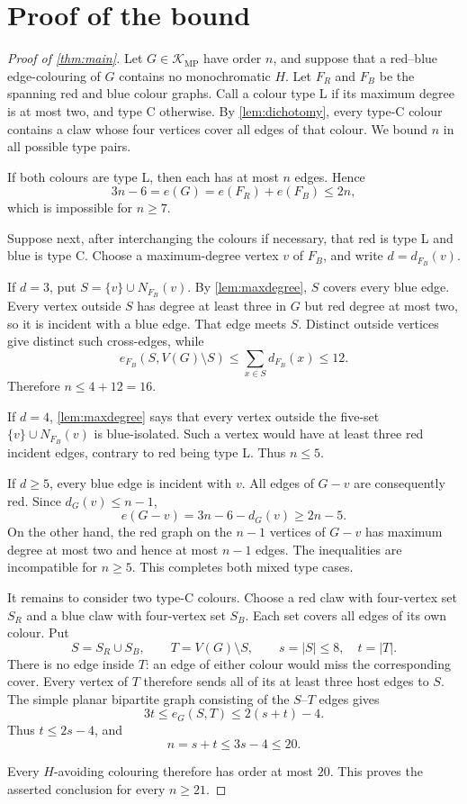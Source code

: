 \documentclass[11pt]{article}
\newcommand{\MP}{\mathrm{MP}}
\newcommand{\cK}{\mathcal{K}}
\begin{document}
\section{Proof of the bound}

\begin{proof}[Proof of \cref{thm:main}]
Let $G\in\cK_{\MP}$ have order $n$, and suppose that a red--blue
edge-colouring of $G$ contains no monochromatic $H$.  Let $F_R$ and $F_B$
be the spanning red and blue colour graphs.  Call a colour type L if its
maximum degree is at most two, and type C otherwise.  By
\cref{lem:dichotomy}, every type-C colour contains a claw whose four
vertices cover all edges of that colour.  We bound $n$ in all possible
type pairs.

If both colours are type L, then each has at most $n$ edges.  Hence
\[
3n-6=e(G)=e(F_R)+e(F_B)\leq2n,
\]
which is impossible for $n\geq7$.

Suppose next, after interchanging the colours if necessary, that red is
type L and blue is type C.  Choose a maximum-degree vertex $v$ of $F_B$,
and write $d=d_{F_B}(v)$.

If $d=3$, put $S=\{v\}\cup N_{F_B}(v)$.  By
\cref{lem:maxdegree}, $S$ covers every blue edge.  Every vertex outside
$S$ has degree at least three in $G$ but red degree at most two, so it is
incident with a blue edge.  That edge meets $S$.  Distinct outside
vertices give distinct such cross-edges, while
\[
e_{F_B}(S,V(G)\setminus S)
   \leq \sum_{x\in S}d_{F_B}(x)\leq12.
\]
Therefore $n\leq4+12=16$.

If $d=4$, \cref{lem:maxdegree} says that every vertex outside the
five-set $\{v\}\cup N_{F_B}(v)$ is blue-isolated.  Such a vertex would
have at least three red incident edges, contrary to red being type L.
Thus $n\leq5$.

If $d\geq5$, every blue edge is incident with $v$.  All edges of $G-v$
are consequently red.  Since $d_G(v)\leq n-1$,
\[
e(G-v)=3n-6-d_G(v)\geq2n-5.
\]
On the other hand, the red graph on the $n-1$ vertices of $G-v$ has
maximum degree at most two and hence at most $n-1$ edges.  The inequalities
are incompatible for $n\geq5$.  This completes both mixed type cases.

It remains to consider two type-C colours.  Choose a red claw with
four-vertex set $S_R$ and a blue claw with four-vertex set $S_B$.  Each
set covers all edges of its own colour.  Put
\[
S=S_R\cup S_B,\qquad T=V(G)\setminus S,
\qquad s=|S|\leq8,\quad t=|T|.
\]
There is no edge inside $T$: an edge of either colour would miss the
corresponding cover.  Every vertex of $T$ therefore sends all of its at
least three host edges to $S$.  The simple planar bipartite graph consisting
of the $S$--$T$ edges gives
\[
3t\leq e_G(S,T)\leq2(s+t)-4.
\]
Thus $t\leq2s-4$, and
\[
n=s+t\leq3s-4\leq20.
\]

Every $H$-avoiding colouring therefore has order at most $20$.  This proves
the asserted conclusion for every $n\geq21$.
\end{proof}
\end{document}
